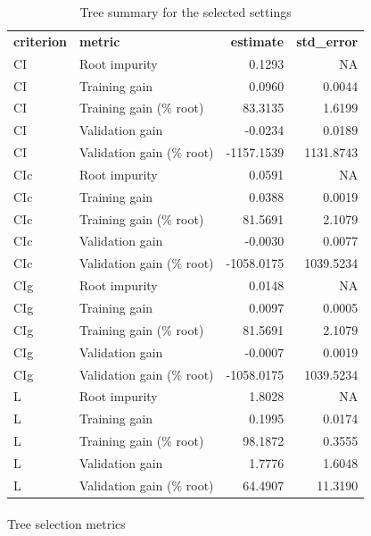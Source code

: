 \documentclass[
  11pt,
  a4paper,
]{article}
\makeatletter
\let\oldparagraph\paragraph
\renewcommand{\paragraph}{
    \@ifstar
      \xxxParagraphStar
      \xxxParagraphNoStar
  }
\newcommand{\xxxParagraphStar}[1]{\oldparagraph*{#1}\mbox{}}
\newcommand{\xxxParagraphNoStar}[1]{\oldparagraph{#1}\mbox{}}
\makeatother
\begin{document}
\begin{longtable}[t]{llrr}

\caption{\label{tbl-appendix-tree-selected-setting-summary}Tree summary
for the selected settings}

\tabularnewline

\\
\toprule
\textbf{criterion} & \textbf{metric} & \textbf{estimate} & \textbf{std\_error}\\
\midrule
CI & Root impurity & 0.1293 & NA\\
CI & Training gain & 0.0960 & 0.0044\\
CI & Training gain (\% root) & 83.3135 & 1.6199\\
CI & Validation gain & -0.0234 & 0.0189\\
CI & Validation gain (\% root) & -1157.1539 & 1131.8743\\
\addlinespace
CIc & Root impurity & 0.0591 & NA\\
CIc & Training gain & 0.0388 & 0.0019\\
CIc & Training gain (\% root) & 81.5691 & 2.1079\\
CIc & Validation gain & -0.0030 & 0.0077\\
CIc & Validation gain (\% root) & -1058.0175 & 1039.5234\\
\addlinespace
CIg & Root impurity & 0.0148 & NA\\
CIg & Training gain & 0.0097 & 0.0005\\
CIg & Training gain (\% root) & 81.5691 & 2.1079\\
CIg & Validation gain & -0.0007 & 0.0019\\
CIg & Validation gain (\% root) & -1058.0175 & 1039.5234\\
\addlinespace
L & Root impurity & 1.8028 & NA\\
L & Training gain & 0.1995 & 0.0174\\
L & Training gain (\% root) & 98.1872 & 0.3555\\
L & Validation gain & 1.7776 & 1.6048\\
L & Validation gain (\% root) & 64.4907 & 11.3190\\
\bottomrule

\end{longtable}

\endgroup{}

\paragraph{Tree selection metrics}\label{tree-selection-metrics}
\end{document}
